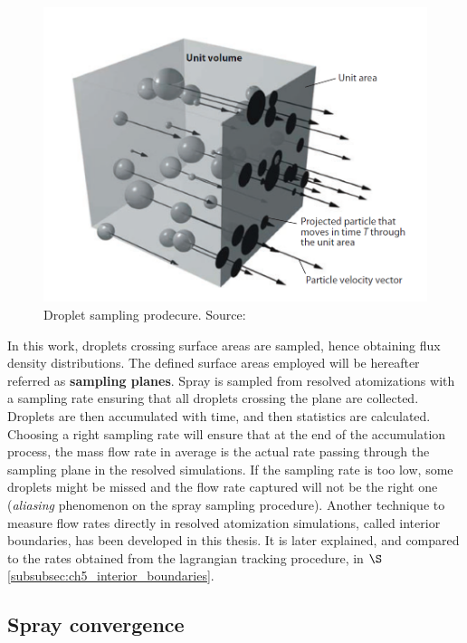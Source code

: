 \begin{figure}[h!]
	\centering
	\includegraphics[scale=0.6]{./part2_developments/figures_ch4_SLI/tropea_droplet_sampling}
	\caption{Droplet sampling prodecure. Source: }
	\label{fig:tropea_droplet_sampling}
\end{figure}

In this work, droplets crossing surface areas are sampled, hence obtaining flux density distributions. The defined surface areas employed will be hereafter referred as \textbf{sampling planes}. Spray is sampled from resolved atomizations with a sampling rate ensuring that all droplets crossing the plane are collected. Droplets are then accumulated with time, and then statistics are calculated. Choosing a right sampling rate will ensure that at the end of the accumulation process, the mass flow rate in average is the actual rate passing through the sampling plane in the resolved simulations. If the sampling rate is too low, some droplets might be missed and the flow rate captured will not be the right one (\textit{aliasing} phenomenon on the spray sampling procedure). Another technique to measure flow rates directly in resolved atomization simulations, called interior boundaries, has been developed in this thesis. It is later explained, and compared to the rates obtained from the lagrangian tracking procedure, in $\S$\ref{subsubsec:ch5_interior_boundaries}.


\subsection{Spray convergence}
\label{subsec:SLI_spray_convergence}

